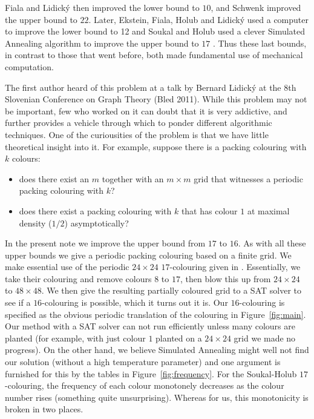 \documentclass[a4paper,12pt]{article}
\theoremstyle{remark}
\begin{document}
Fiala and Lidick\'y \cite{FialaLidicky07} then improved the lower bound to $10$, and Schwenk \cite{Schwenk02} improved the upper bound to $22$. Later, Ekstein, Fiala, Holub and Lidick\'y used a computer to improve the lower bound to 12 \cite{EksteinFialaHolubLidicky07} and Soukal and Holub used a clever Simulated Annealing algorithm to improve the upper bound to $17$ \cite{SoukalHolub10}. Thus these last bounds, in contrast to those that went before, both made fundamental use of mechanical computation.

The first author heard of this problem at a talk by Bernard Lidick\'y at the 8th Slovenian Conference on Graph Theory (Bled 2011). While this problem may not be important, few who worked on it can doubt that it is very addictive, and further provides a vehicle through which to ponder different algorithmic techniques. One of the curiousities of the problem is that we have little theoretical insight into it. For example, suppose there is a packing colouring with $k$ colours:
\begin{itemize}
\item does there exist an $m$ together with an $m \times m$ grid that witnesses a periodic packing colouring with $k$?
\item does there exist a packing colouring with $k$ that has colour $1$ at maximal density ($1/2$) asymptotically?
\end{itemize}

In the present note we improve the upper bound from $17$ to $16$. As with all these upper bounds we give a periodic packing colouring based on a finite grid. We make essential use of the periodic $24 \times 24$ $17$-colouring given in \cite{SoukalHolub10}. Essentially, we take their colouring and remove colours $8$ to $17$, then blow this up from $24 \times 24$ to $48 \times 48$. We then give the resulting partially coloured grid to a SAT solver to see if a $16$-colouring is possible, which it turns out it is. Our $16$-colouring is specified as the obvious periodic translation of the colouring in Figure~\ref{fig:main}. Our method with a SAT solver can not run efficiently unless many colours are planted (for example, with just colour $1$ planted on a $24 \times 24$ grid we made no progress). On the other hand, we believe Simulated Annealing might well not find our solution (without a high temperature parameter) and one argument is furnished for this by the tables in Figure~\ref{fig:frequency}. For the Soukal-Holub $17$-colouring, the frequency of each colour monotonely decreases as the colour number rises (something quite unsurprising). Whereas for us, this monotonicity is broken in two places.
\end{document}
